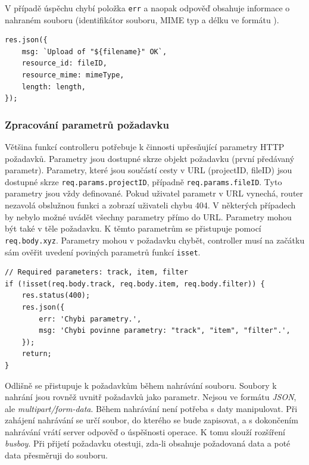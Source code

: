 V případě úspěchu chybí položka \texttt{err} a naopak odpověď obsahuje informace o nahraném souboru (identifikátor souboru, MIME typ a délku ve formátu ).
\begin{lstlisting}[style=JavaScript]
res.json({
    msg: `Upload of "${filename}" OK`,
    resource_id: fileID,
    resource_mime: mimeType,
    length: length,
});
\end{lstlisting}

\subsubsection{Zpracování parametrů požadavku}
Většina funkcí controlleru potřebuje k činnosti upřesňující parametry HTTP požadavků. Parametry jsou dostupné skrze objekt požadavku (první předávaný parametr). Parametry, které jsou součástí cesty v URL (projectID, fileID) jsou dostupné skrze \texttt{req.params.projectID}, případně \texttt{req.params.fileID}. Tyto parametry jsou vždy definované. Pokud uživatel parametr v URL vynechá, router nezavolá obslužnou funkci a zobrazí uživateli chybu 404. V některých případech by nebylo možné uvádět všechny parametry přímo do URL. Parametry mohou být také v těle požadavku. K těmto parametrům se přistupuje pomocí \texttt{req.body.xyz}. Parametry mohou v požadavku chybět, controller musí na začátku sám ověřit uvedení poviných parametrů funkcí \texttt{isset}.
\begin{lstlisting}[style=JavaScript]
// Required parameters: track, item, filter
if (!isset(req.body.track, req.body.item, req.body.filter)) {
    res.status(400);
    res.json({
        err: 'Chybi parametry.',
        msg: 'Chybi povinne parametry: "track", "item", "filter".',
    });
    return;
}
\end{lstlisting}

Odlišně se přistupuje k požadavkům během nahrávání souboru. Soubory k nahrání jsou rovněž uvnitř požadavků jako parametr. Nejsou ve formátu \textit{JSON}, ale \textit{multipart/form-data}. Během nahrávání není potřeba s daty manipulovat. Při zahájení nahrávání se určí soubor, do kterého se bude zapisovat, a s dokončením nahrávání vrátí server odpověď o úspěšnosti operace. K tomu slouží rozšíření \textit{busboy}. Při přijetí požadavku otestuji, zda-li obsahuje požadovaná data a poté data přesměruji do souboru.

